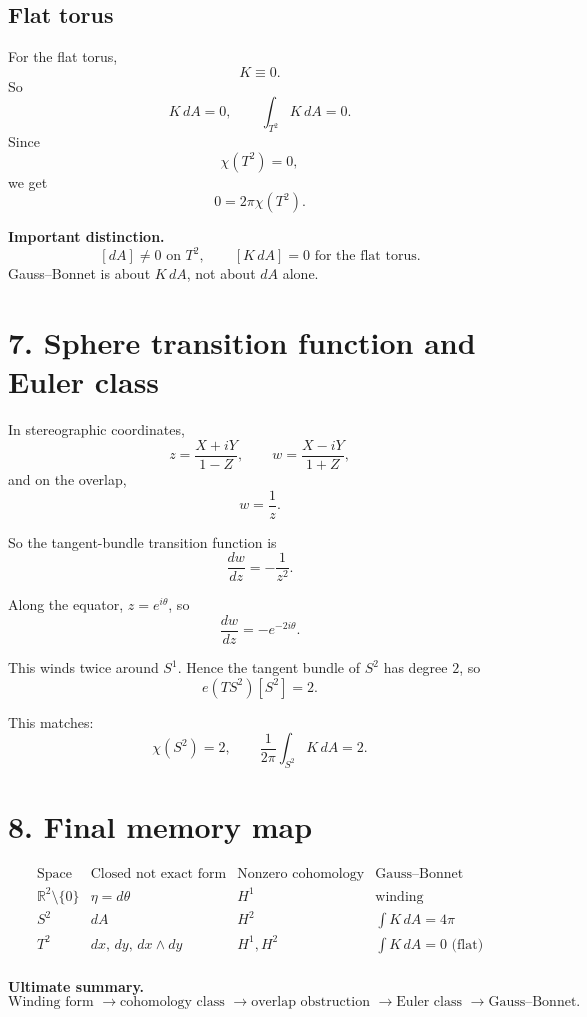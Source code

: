 \documentclass[11pt]{article}
\begin{document}
	\subsection*{Flat torus}
	For the flat torus,
	\[
	K\equiv 0.
	\]
	So
	\[
	K\,dA=0,
	\qquad
	\int_{T^2}K\,dA=0.
	\]
	Since
	\[
	\chi(T^2)=0,
	\]
	we get
	\[
	0=2\pi\chi(T^2).
	\]
	
	\begin{framed}
		\noindent\textbf{Important distinction.}
		\[
		[dA]\neq 0 \text{ on }T^2,
		\qquad
		[K\,dA]=0 \text{ for the flat torus.}
		\]
		Gauss--Bonnet is about \(K\,dA\), not about \(dA\) alone.
	\end{framed}
	
	\section*{7. Sphere transition function and Euler class}
	
	In stereographic coordinates,
	\[
	z=\frac{X+iY}{1-Z},\qquad
	w=\frac{X-iY}{1+Z},
	\]
	and on the overlap,
	\[
	w=\frac{1}{z}.
	\]
	
	So the tangent-bundle transition function is
	\[
	\frac{dw}{dz}=-\frac{1}{z^2}.
	\]
	
	Along the equator, \(z=e^{i\theta}\), so
	\[
	\frac{dw}{dz}=-e^{-2i\theta}.
	\]
	
	This winds twice around \(S^1\). Hence the tangent bundle of \(S^2\) has degree \(2\), so
	\[
	e(TS^2)[S^2]=2.
	\]
	
	This matches:
	\[
	\chi(S^2)=2,
	\qquad
	\frac{1}{2\pi}\int_{S^2}K\,dA=2.
	\]
	
	\section*{8. Final memory map}
	
	\[
	\begin{array}{c|c|c|c}
		\text{Space} & \text{Closed not exact form} & \text{Nonzero cohomology} & \text{Gauss--Bonnet} \\
		\hline
		\mathbb{R}^2\setminus\{0\} & \eta=d\theta & H^1 & \text{winding} \\
		S^2 & dA & H^2 & \int K\,dA=4\pi \\
		T^2 & dx,\,dy,\,dx\wedge dy & H^1,H^2 & \int K\,dA=0 \text{ (flat)} \\
	\end{array}
	\]
	
	\begin{framed}
		\noindent\textbf{Ultimate summary.}
		\[
		\boxed{
			\text{Winding form } \longrightarrow \text{cohomology class } \longrightarrow
			\text{overlap obstruction } \longrightarrow
			\text{Euler class } \longrightarrow
			\text{Gauss--Bonnet.}
		}
		\]
	\end{framed}
	
\end{document}
